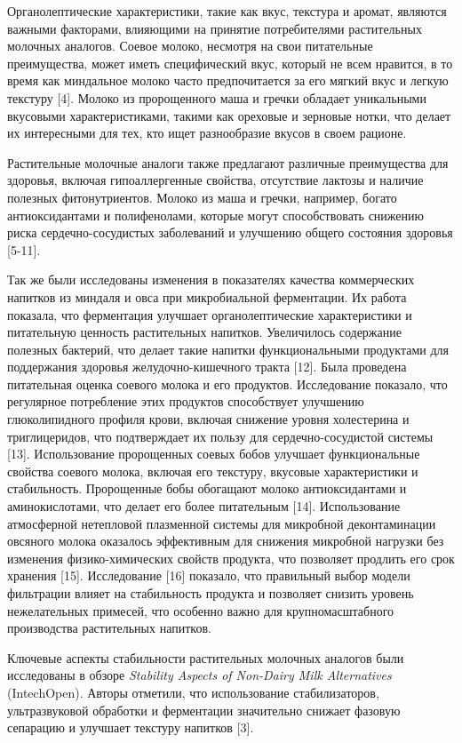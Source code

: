 \begin{multicols}{2}
Органолептические характеристики, такие как вкус, текстура и аромат,
являются важными факторами, влияющими на принятие потребителями
растительных молочных аналогов. Соевое молоко, несмотря на свои
питательные преимущества, может иметь специфический вкус, который не
всем нравится, в то время как миндальное молоко часто предпочитается за
его мягкий вкус и легкую текстуру {[}4{]}. Молоко из пророщенного маша и
гречки обладает уникальными вкусовыми характеристиками, такими как
ореховые и зерновые нотки, что делает их интересными для тех, кто ищет
разнообразие вкусов в своем рационе.

Растительные молочные аналоги также предлагают различные преимущества
для здоровья, включая гипоаллергенные свойства, отсутствие лактозы и
наличие полезных фитонутриентов. Молоко из маша и гречки, например,
богато антиоксидантами и полифенолами, которые могут способствовать
снижению риска сердечно-сосудистых заболеваний и улучшению общего
состояния здоровья {[}5-11{]}.

Так же были исследованы изменения в показателях качества коммерческих
напитков из миндаля и овса при микробиальной ферментации. Их работа
показала, что ферментация улучшает органолептические характеристики и
питательную ценность растительных напитков. Увеличилось содержание
полезных бактерий, что делает такие напитки функциональными продуктами
для поддержания здоровья желудочно-кишечного тракта {[}12{]}. Была
проведена питательная оценка соевого молока и его продуктов.
Исследование показало, что регулярное потребление этих продуктов
способствует улучшению глюколипидного профиля крови, включая снижение
уровня холестерина и триглицеридов, что подтверждает их пользу для
сердечно-сосудистой системы {[}13{]}. Использование пророщенных соевых
бобов улучшает функциональные свойства соевого молока, включая его
текстуру, вкусовые характеристики и стабильность. Пророщенные бобы
обогащают молоко антиоксидантами и аминокислотами, что делает его более
питательным {[}14{]}. Использование атмосферной нетепловой плазменной
системы для микробной деконтаминации овсяного молока оказалось
эффективным для снижения микробной нагрузки без изменения
физико-химических свойств продукта, что позволяет продлить его срок
хранения {[}15{]}. Исследование {[}16{]} показало, что правильный выбор
модели фильтрации влияет на стабильность продукта и позволяет снизить
уровень нежелательных примесей, что особенно важно для крупномасштабного
производства растительных напитков.

Ключевые аспекты стабильности растительных молочных аналогов были
исследованы в обзоре \emph{Stability Aspects of Non-Dairy Milk
Alternatives} (IntechOpen). Авторы отметили, что использование
стабилизаторов, ультразвуковой обработки и ферментации значительно
снижает фазовую сепарацию и улучшает текстуру напитков {[}3{]}.


\end{multicols}
